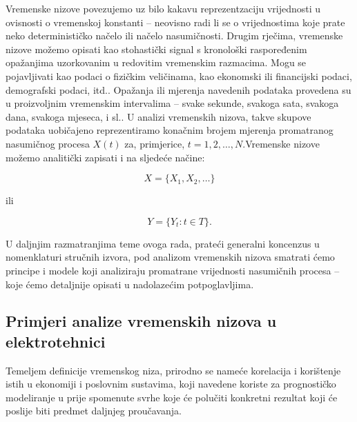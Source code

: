 \documentclass[a4paper,12pt,oneside]{memoir}
\begin{document}
            Vremenske nizove povezujemo uz bilo kakavu reprezentzaciju vrijednosti u ovisnosti o vremenskoj konstanti -- neovisno radi li se o vrijednostima koje prate neko determinističko načelo ili načelo nasumičnosti. Drugim rječima, vremenske nizove možemo opisati kao stohastički signal s kronološki raspoređenim opažanjima uzorkovanim u redovitim vremenskim razmacima. Mogu se pojavljivati kao podaci o fizičkim veličinama, kao ekonomski ili financijski podaci, demografski podaci, itd.. Opažanja ili mjerenja navedenih podataka provedena su u proizvoljnim vremenskim intervalima -- svake sekunde, svakoga sata, svakoga dana, svakoga mjeseca, i sl.. U analizi vremenskih nizova, takve skupove podataka uobičajeno reprezentiramo konačnim brojem mjerenja promatranog nasumičnog procesa $X(t)$ za, primjerice, $t=1,2,\ldots,N$.\cite{Priestley}Vremenske nizove možemo analitički zapisati i na sljedeće načine:

            \begin{equation}
                X=\{X_1,X_2,\ldots\}
            \end{equation}

            ili

            \begin{equation}
                Y=\{Y_t: t\in T\}.
            \end{equation}
            
            U daljnjim razmatranjima teme ovoga rada, prateći generalni koncenzus u nomenklaturi stručnih izvora, pod analizom vremenskih nizova smatrati ćemo principe i modele koji analiziraju promatrane vrijednosti nasumičnih procesa -- koje ćemo detaljnije opisati u nadolazećim potpoglavljima.

        \subsection{Primjeri analize vremenskih nizova u elektrotehnici}
            Temeljem definicije vremenskog niza, prirodno se nameće korelacija i korištenje istih u ekonomiji i poslovnim sustavima, koji navedene koriste za prognostičko modeliranje u prije spomenute svrhe koje će polučiti konkretni rezultat koji će poslije biti predmet daljnjeg proučavanja.
\end{document}
